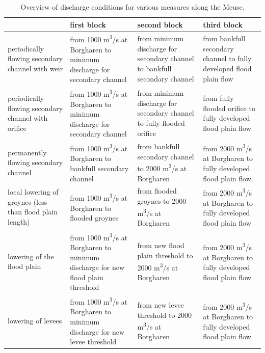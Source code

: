 \begin{table}
\begin{tabular}{p{}|p{}|p{}|p{}}
 & first block & second block & third block \\ \hline
periodically flowing secondary channel with weir & from 1000 m\textsuperscript{3}/s at Borgharen to minimum discharge for secondary channel & from minimum discharge for secondary channel to bankfull secondary channel & from bankfull secondary channel to fully developed flood plain flow \\ \hline
periodically flowing secondary channel with orifice & from 1000 m\textsuperscript{3}/s at Borgharen to minimum discharge for secondary channel & from minimum discharge for secondary channel to fully flooded orifice & from fully flooded orifice to fully developed flood plain flow \\ \hline
permanently flowing secondary channel & from 1000 m\textsuperscript{3}/s at Borgharen to bankfull secondary channel & from bankfull secondary channel to 2000 m\textsuperscript{3}/s at Borgharen & from 2000 m\textsuperscript{3}/s at Borgharen to fully developed flood plain flow \\ \hline
local lowering of groynes (less than flood plain length) & from 1000 m\textsuperscript{3}/s at Borgharen to flooded groynes & from flooded groynes to 2000 m\textsuperscript{3}/s at Borgharen & from 2000 m\textsuperscript{3}/s at Borgharen to fully developed flood plain flow \\ \hline
lowering of the flood plain & from 1000 m\textsuperscript{3}/s at Borgharen to minimum discharge for new flood plain threshold & from new flood plain threshold to 2000 m\textsuperscript{3}/s at Borgharen & from 2000 m\textsuperscript{3}/s at Borgharen to fully developed flood plain flow \\ \hline
lowering of levees & from 1000 m\textsuperscript{3}/s at Borgharen to minimum discharge for new levee threshold & from new levee threshold to 2000 m\textsuperscript{3}/s at Borgharen & from 2000 m\textsuperscript{3}/s at Borgharen to fully developed flood plain flow \\
\end{tabular}

\caption{Overview of discharge conditions for various measures along the Meuse.}
\label{Tab3}
\end{table}

